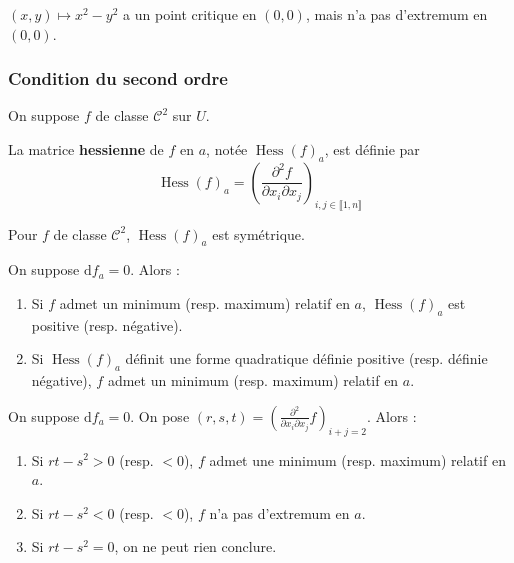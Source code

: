 
  \begin{cexample}
    $(x,y) \mapsto x^2-y^2$ a un point critique en $(0,0)$, mais n'a pas d'extremum en $(0,0)$.
  \end{cexample}

  \subsubsection{Condition du second ordre}


  On suppose $f$ de classe $\mathcal{C}^2$ sur $U$.

  \begin{definition}
    La matrice \textbf{hessienne} de $f$ en $a$, notée $\operatorname{Hess}(f)_a$, est définie par
    \[ \operatorname{Hess}(f)_a = \left( \frac{\partial^2 f}{\partial x_i \partial x_j} \right)_{i,j \in \llbracket 1, n \rrbracket} \]
  \end{definition}

  \begin{remark}
    Pour $f$ de classe $\mathcal{C}^2$, $\operatorname{Hess}(f)_a$ est symétrique.
  \end{remark}

  \begin{theorem}
    On suppose $\mathrm{d}f_a = 0$. Alors :
    \begin{enumerate}[label=(\roman*)]
      \item Si $f$ admet un minimum (resp. maximum) relatif en $a$, $\operatorname{Hess}(f)_a$ est positive (resp. négative).
      \item Si $\operatorname{Hess}(f)_a$ définit une forme quadratique définie positive (resp. définie négative), $f$ admet un minimum (resp. maximum) relatif en $a$.
    \end{enumerate}
  \end{theorem}

  \begin{example}
    On suppose $\mathrm{d}f_a = 0$. On pose $(r,s,t) = \left(  \frac{\partial^2}{\partial x_i \partial x_j} f \right)_{i+j=2}$. Alors :
    \begin{enumerate}[label=(\roman*)]
      \item Si $rt-s^2 > 0$ (resp. $< 0$), $f$ admet une minimum (resp. maximum) relatif en $a$.
      \item Si $rt-s^2 < 0$ (resp. $< 0$), $f$ n'a pas d'extremum en $a$.
      \item Si $rt-s^2 = 0$, on ne peut rien conclure.
    \end{enumerate}
  \end{example}

